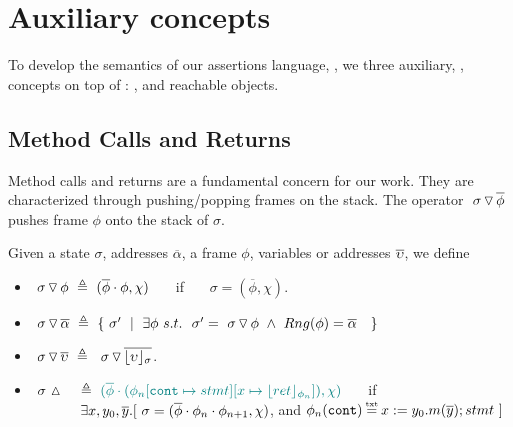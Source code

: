 {%


\section{Auxiliary concepts}
\label{s:auxiliary}

{To develop the semantics of our assertions language, \AssertLang, we    three auxiliary, , concepts on  top of  \LangOO: , and reachable objects.}

\subsection{ Method Calls and Returns}

 
 
Method calls and returns are a fundamental concern for our work. 
They are characterized through pushing/popping   frames on the stack.  
The operator   $  \ {\sigma} \, {\triangledown}\, \overline{\phi} $ pushes 
frame $\phi$ onto the stack of $\sigma$.
 
 

\begin{definition}
\label{def:push:frame}
Given a state $\sigma$, addresses $\overline \alpha$, a frame $\phi$,  variables or addresses $\overline {\upsilon}$, we define
\begin{itemize}
\item
 $  \ {\sigma} \, {\triangledown}\, {\phi}  \ \triangleq \ ({\overline{\phi}\cdot\phi}, \chi)$ \ \ \  if \ \ \  $\sigma=(\overline{\phi}, \chi)$.
\item
$ \PushS  {\alpha} {\sigma} \ \triangleq\ \{ \ \sigma' \ \mid\ \exists \phi  \ s.t.\ \ 
   \sigma'=\PushSF  {\phi} {\sigma}  \ \wedge\    Rng(\phi)=\overline \alpha \ \   \ \}$
\item
{$  \ {\sigma} \, {\triangledown}\, \overline{\upsilon} \  \triangleq\      \ {\sigma} \, {\triangledown}\, \overline{\lfloor \upsilon \rfloor_{\sigma}}  $.}
\item
$ \ \sigma\, \popSymbol \ \ \  \triangleq\   \sdN{ (\overline{\phi}\cdot (\phi_n[\prg{cont}\mapsto stmt][x \mapsto \interpret {\phi_n}{ret}]), \chi)}$ \ \ \  if \\
 $\strut \hspace{1.2cm}  \exists x, y_0, \overline y. [ \ \sigma=(\overline{\phi}\cdot\phi_n\cdot\phi_{n+1}, \chi)$, and $\phi_n(\prg{cont})\txteq x:= y_0.m(\overline y); stmt \ ]$
\end{itemize}
 \end{definition}

}
